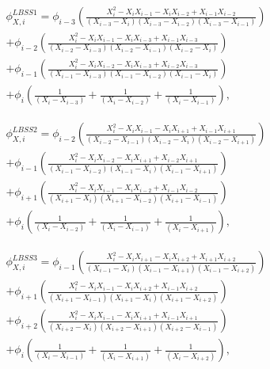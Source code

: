 \documentclass[preprint,12pt]{elsarticle}
\begin{document}
\begin{multline}
\phi_{X,i}^{LBSS1}=\phi_{i-3}\left(\frac{X_{i}^{2}-X_{i}X_{i-1}-X_{i}X_{i-2}+X_{i-1}X_{i-2}}{\left(X_{i-3}-X_{i}\right)\left(X_{i-3}-X_{i-2}\right)\left(X_{i-3}-X_{i-1}\right)}\right)\\
+\phi_{i-2}\left(\frac{X_{i}^{2}-X_{i}X_{i-1}-X_{i}X_{i-3}+X_{i-1}X_{i-3}}{\left(X_{i-2}-X_{i-3}\right)\left(X_{i-2}-X_{i-1}\right)\left(X_{i-2}-X_{i}\right)}\right)\\
+\phi_{i-1}\left(\frac{X_{i}^{2}-X_{i}X_{i-2}-X_{i}X_{i-3}+X_{i-2}X_{i-3}}{\left(X_{i-1}-X_{i-3}\right)\left(X_{i-1}-X_{i-2}\right)\left(X_{i-1}-X_{i}\right)}\right)\\
+\phi_{i}\left(\frac{1}{\left(X_{i}-X_{i-3}\right)}+\frac{1}{\left(X_{i}-X_{i-2}\right)}+\frac{1}{\left(X_{i}-X_{i-1}\right)}\right),\label{eq:2.22-2}
\end{multline}


\begin{multline}
\phi_{X,i}^{LBSS2}=\phi_{i-2}\left(\frac{X_{i}^{2}-X_{i}X_{i-1}-X_{i}X_{i+1}+X_{i-1}X_{i+1}}{\left(X_{i-2}-X_{i-1}\right)\left(X_{i-2}-X_{i}\right)\left(X_{i-2}-X_{i+1}\right)}\right)\\
+\phi_{i-1}\left(\frac{X_{i}^{2}-X_{i}X_{i-2}-X_{i}X_{i+1}+X_{i-2}X_{i+1}}{\left(X_{i-1}-X_{i-2}\right)\left(X_{i-1}-X_{i}\right)\left(X_{i-1}-X_{i+1}\right)}\right)\\
+\phi_{i+1}\left(\frac{X_{i}^{2}-X_{i}X_{i-1}-X_{i}X_{i-2}+X_{i-1}X_{i-2}}{\left(X_{i+1}-X_{i}\right)\left(X_{i+1}-X_{i-2}\right)\left(X_{i+1}-X_{i-1}\right)}\right)\\
+\phi_{i}\left(\frac{1}{\left(X_{i}-X_{i-2}\right)}+\frac{1}{\left(X_{i}-X_{i-1}\right)}+\frac{1}{\left(X_{i}-X_{i+1}\right)}\right),\label{eq:2.28-1}
\end{multline}


\begin{multline}
\phi_{X,i}^{LBSS3}=\phi_{i-1}\left(\frac{X_{i}^{2}-X_{i}X_{i+1}-X_{i}X_{i+2}+X_{i+1}X_{i+2}}{\left(X_{i-1}-X_{i}\right)\left(X_{i-1}-X_{i+1}\right)\left(X_{i-1}-X_{i+2}\right)}\right)\\
+\phi_{i+1}\left(\frac{X_{i}^{2}-X_{i}X_{i-1}-X_{i}X_{i+2}+X_{i-1}X_{i+2}}{\left(X_{i+1}-X_{i-1}\right)\left(X_{i+1}-X_{i}\right)\left(X_{i+1}-X_{i+2}\right)}\right)\\
+\phi_{i+2}\left(\frac{X_{i}^{2}-X_{i}X_{i-1}-X_{i}X_{i+1}+X_{i-1}X_{i+1}}{\left(X_{i+2}-X_{i}\right)\left(X_{i+2}-X_{i+1}\right)\left(X_{i+2}-X_{i-1}\right)}\right)\\
+\phi_{i}\left(\frac{1}{\left(X_{i}-X_{i-1}\right)}+\frac{1}{\left(X_{i}-X_{i+1}\right)}+\frac{1}{\left(X_{i}-X_{i+2}\right)}\right),\label{eq:2.29-1}
\end{multline}
\end{document}
